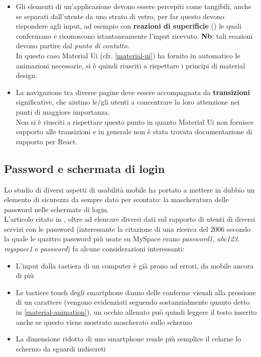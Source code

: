 \begin{itemize}
\item Gli elementi di un'applicazione devono essere percepiti come tangibili, anche
se separati dall'utente da uno strato di vetro, per far questo devono rispondere agli
input, ad esempio con \textbf{reazioni di superificie} (\textit{})
le quali confermano
e riconoscono istantaneamente l'input ricevuto. \textbf{Nb}: tali reazioni devono
partire dal \textit{punto di contatto}. \\
In questo caso Material Ui (cfr. \ref{material-ui}) ha fornito in automatico le animazioni
necessarie, si è quindi riusciti a rispettare i principi di material design.
\item La navigazione tra diverse pagine deve essere accompagnata da
\textbf{transizioni} significative, che aiutino le/gli utenti a concentrare la loro
attenzione nei punti di maggiore importanza. \\
Non si è riusciti a rispettare questo punto in quanto Material Ui non fornisce supporto
alle transizioni e in generale non è stata trovata documentazione di supporto per
React.
\end{itemize}

\subsection[Password e schermata di login]{Password e schermata di login}\label{password}

Lo studio di diversi aspetti di usabilità mobile ha portato a mettere in dubbio un elemento
di sicurezza da sempre dato per scontato: la mascheratura delle password nelle schermate di
login. \\
L'articolo citato in \cite{luke-pass}, oltre ad elencare diversi dati sul rapporto di utenti di diversi servizi
con le password (interessante la citazione di una ricerca del 2006 secondo la quale le quattro
password più usate su MySpace erano \textit{password1}, \textit{abc123}, \textit{myspace1} e
\textit{password}) fa alcune considerazioni interessanti:

\begin{itemize}
\item L'input dalla tastiera di un computer è già prono ad errori, da mobile ancora di più
\item Le tastiere touch degli smartphone danno delle conferme visuali alla pressione di un
carattere (vengono evidenziati seguendo sostanzialmente quanto detto in \ref{material-animation}),
un occhio allenato può quindi leggere il testo inserito anche se questo viene mostrato
mascherato sullo schermo
\item La dimensione ridotta di uno smartphone rende più semplice il celarne lo schermo
da sguardi indiscreti
\end{itemize}

